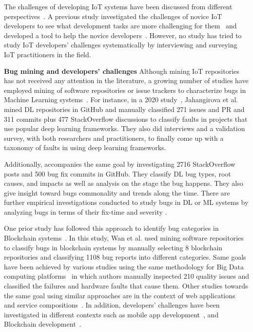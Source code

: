 The challenges of developing IoT systems have been discussed from different perspectives~\cite{stojkoska2017review,vcolakovic2018IoT,hnat2011hitchhiker}. A previous study investigated the challenges of novice IoT developers to see what development tasks are more challenging for them~\cite{corno2019challenges} and developed a tool to help the novice developers~\cite{corno2019towards}. However, no study has tried to study IoT developers' challenges systematically by interviewing and surveying IoT practitioners in the field.


\textbf{Bug mining and developers' challenges}
Although mining IoT repositories has not received any attention in the literature, a growing number of studies have employed mining of software repositories or issue trackers to characterize bugs in Machine Learning systems~\cite{DlTaxFaults,zhangempiricalDL2020ICSE,islam2019comprehensive, TensorFBugsISSTA}. For instance, in a 2020 study~\cite{DlTaxFaults}, Jahangirova et al. mined DL repositories in GitHub and manually classified 271 issues and PR and 311 commits plus 477 StackOverflow discussions to classify faults in projects that use popular deep learning frameworks. They also did interviews and a validation survey, with both researchers and practitioners, to finally come up with a taxonomy of faults in using deep learning frameworks.

Additionally, \cite{islam2019comprehensive} accompanies the same goal by investigating 2716 StackOverflow posts and 500 bug fix commits in GitHub. They classify DL bug types, root causes, and impacts as well as analysis on the stage the bug happens. They also give insight toward bugs commonality and trends along the time. There are further empirical investigations conducted to study bugs in DL or ML systems by analyzing bugs in terms of their fix-time and severity\cite{MLrealBugs} \cite{FerdianMLBugs} \cite{TensorFBugsISSTA}. 


 One prior study has followed this approach to identify bug categories in Blockchain systems~\cite{blockChainBugs}. In this study, Wan et al. used mining software repositories to classify bugs in blockchain systems \cite{blockChainBugs} by manually selecting 8 blockchain repositories and classifying 1108 bug reports into different categories. Same goals have been achieved by various studies using the same methodology for Big Data computing platforms~\cite{bigDataIssues} in which authors manually inspected 210 quality issues and classified the failures and hardware faults that cause them. Other studies towards the same goal using similar approaches are in the context of web applications~\cite{jsBugsOcariza} and service compositions~\cite{chan2007fault}. 
In addition, developers' challenges have been investigated in different contexts such as mobile app development~\cite{joorabchi2013real}, and Blockchain development~\cite{zou2019smart}. 


\endinput

